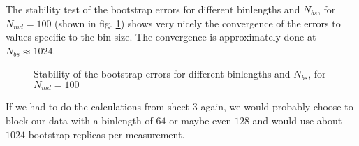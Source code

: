 \documentclass{scrartcl}
\begin{document}
%	
The stability test of the bootstrap errors for different binlengths and $N_{bs}$, for $N_{md}=100$ (shown in fig. \ref{fig:errorstabilitynmd100}) shows very nicely the convergence of the errors to values specific to  the bin size. The convergence is approximately done at $N_{bs}\approx 1024$.
\begin{figure}[htbp]
	
	\caption{Stability of the bootstrap errors for different binlengths and $N_{bs}$, for $N_{md}=100$}
	\label{fig:errorstabilitynmd100}
\end{figure}

If we had to do the calculations from sheet 3 again, we would probably choose to block our data with a binlength of $64$ or maybe even $128$ and would use about $1024$ bootstrap replicas per measurement.
\newpage	
\listoffigures
\printbibliography
\end{document}
